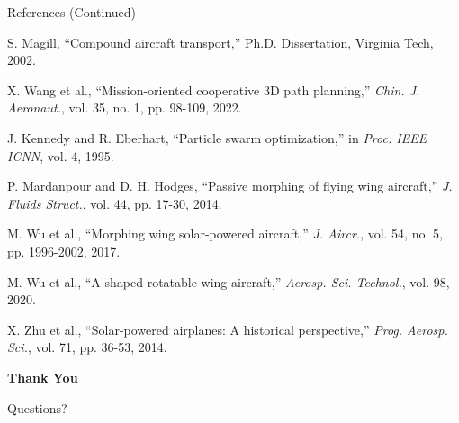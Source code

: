 \documentclass{beamer}
\begin{document}
\begin{frame}{References (Continued)}
    \scriptsize
    \setlength{\itemsep}{1pt}
    \setlength{\parskip}{1pt}
    \begin{thebibliography}{99}
        \setcounter{enumiv}{8} %
        
         S. Magill, ``Compound aircraft transport,'' Ph.D. Dissertation, Virginia Tech, 2002.
        
         X. Wang et al., ``Mission-oriented cooperative 3D path planning,'' \emph{Chin. J. Aeronaut.}, vol. 35, no. 1, pp. 98-109, 2022.
        
         J. Kennedy and R. Eberhart, ``Particle swarm optimization,'' in \emph{Proc. IEEE ICNN}, vol. 4, 1995.
        
         P. Mardanpour and D. H. Hodges, ``Passive morphing of flying wing aircraft,'' \emph{J. Fluids Struct.}, vol. 44, pp. 17-30, 2014.
        
         M. Wu et al., ``Morphing wing solar-powered aircraft,'' \emph{J. Aircr.}, vol. 54, no. 5, pp. 1996-2002, 2017.
        
         M. Wu et al., ``A-shaped rotatable wing aircraft,'' \emph{Aerosp. Sci. Technol.}, vol. 98, 2020.
        
         X. Zhu et al., ``Solar-powered airplanes: A historical perspective,'' \emph{Prog. Aerosp. Sci.}, vol. 71, pp. 36-53, 2014.
        
    \end{thebibliography}
\end{frame}
\begin{frame}
    \centering
    \vspace{1.5cm}
    
    \Huge \textbf{Thank You}
    
    \vspace{1cm}
    \Large Questions?
\end{frame}
	
\end{document}
